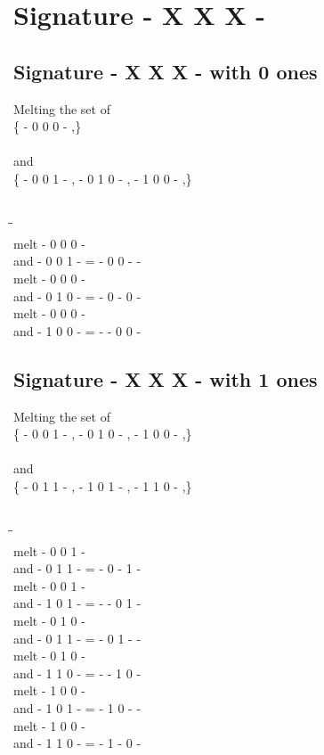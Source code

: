 \documentclass{article}
\begin{document}
\section{Signature - X X X - }
\subsection{Signature - X X X - with 0 ones}
Melting the set of\\
\{ -  0  0  0  - ,\}\\\\
and\\
\{ -  0  0  1  - , -  0  1  0  - , -  1  0  0  - ,\}\\\\
\begin{tabbing}
\hspace{3cm}\=\hspace{3cm}\=\hspace{3cm}\\[1cm]
melt\> -  0  0  0  - \\
and\> -  0  0  1  - \>
 =  -  0  0  -  - \\[1mm]
melt\> -  0  0  0  - \\
and\> -  0  1  0  - \>
 =  -  0  -  0  - \\[1mm]
melt\> -  0  0  0  - \\
and\> -  1  0  0  - \>
 =  -  -  0  0  - \\[1mm]
\end{tabbing}
\newpage
\subsection{Signature - X X X - with 1 ones}
Melting the set of\\
\{ -  0  0  1  - , -  0  1  0  - , -  1  0  0  - ,\}\\\\
and\\
\{ -  0  1  1  - , -  1  0  1  - , -  1  1  0  - ,\}\\\\
\begin{tabbing}
\hspace{3cm}\=\hspace{3cm}\=\hspace{3cm}\\[1cm]
melt\> -  0  0  1  - \\
and\> -  0  1  1  - \>
 =  -  0  -  1  - \\[1mm]
melt\> -  0  0  1  - \\
and\> -  1  0  1  - \>
 =  -  -  0  1  - \\[1mm]
melt\> -  0  1  0  - \\
and\> -  0  1  1  - \>
 =  -  0  1  -  - \\[1mm]
melt\> -  0  1  0  - \\
and\> -  1  1  0  - \>
 =  -  -  1  0  - \\[1mm]
melt\> -  1  0  0  - \\
and\> -  1  0  1  - \>
 =  -  1  0  -  - \\[1mm]
melt\> -  1  0  0  - \\
and\> -  1  1  0  - \>
 =  -  1  -  0  - \\[1mm]
\end{tabbing}
\newpage
\end{document}
